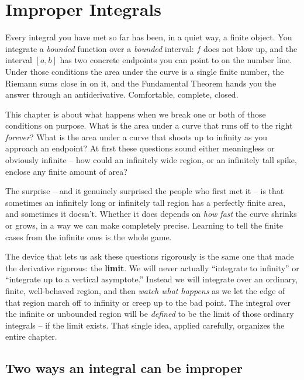 \chapter{Improper Integrals}

Every integral you have met so far has been, in a quiet way, a finite object.
You integrate a \emph{bounded} function over a \emph{bounded} interval: $f$ does
not blow up, and the interval $[a,b]$ has two concrete endpoints you can point to
on the number line. Under those conditions the area under the curve is a single
finite number, the Riemann sums close in on it, and the Fundamental Theorem
hands you the answer through an antiderivative. Comfortable, complete, closed.

This chapter is about what happens when we break one or both of those
conditions on purpose. What is the area under a curve that runs off to the right
\emph{forever}? What is the area under a curve that shoots up to infinity as you
approach an endpoint? At first these questions sound either meaningless or
obviously infinite -- how could an infinitely wide region, or an infinitely tall
spike, enclose any finite amount of area?

\begin{focusbox}
The surprise -- and it genuinely surprised the people who first met it -- is that
sometimes an infinitely long or infinitely tall region has a perfectly finite
area, and sometimes it doesn't. Whether it does depends on \emph{how fast} the
curve shrinks or grows, in a way we can make completely precise. Learning to tell
the finite cases from the infinite ones is the whole game.
\end{focusbox}

The device that lets us ask these questions rigorously is the same one that made
the derivative rigorous: the \textbf{limit}. We will never actually ``integrate to
infinity'' or ``integrate up to a vertical asymptote.'' Instead we will integrate
over an ordinary, finite, well-behaved region, and then \emph{watch what happens}
as we let the edge of that region march off to infinity or creep up to the bad
point. The integral over the infinite or unbounded region will be \emph{defined}
to be the limit of those ordinary integrals -- if the limit exists. That single
idea, applied carefully, organizes the entire chapter.

\chapterline

\section{Two ways an integral can be improper}
\label{ch25:two-ways}

